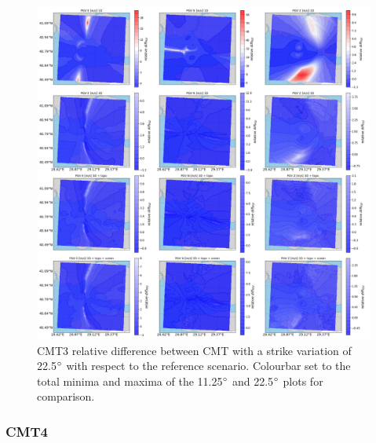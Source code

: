 \documentclass[../Text/00main.tex]{subfiles}
\begin{document}
\begin{figure}[!h]
    \centering
    \includegraphics[width=1\linewidth]{images_results/strike_variation_epsilon25_sc3.png}
    \caption{CMT3 relative difference between CMT with a strike variation of 22.5$\degree$ with respect to the reference scenario. Colourbar set to the total minima and maxima of the 11.25$\degree$ and 22.5$\degree$ plots for comparison.}
    \label{fig:ref_eps25-2}
\end{figure}

\FloatBarrier

\subsubsection{CMT4}
\end{document}
